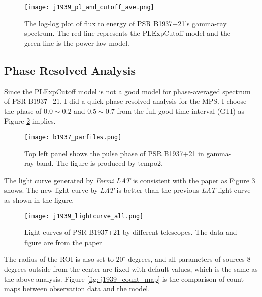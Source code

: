 \documentclass[12pt]{report}
\begin{document}
        \begin{figure}[!htp]
          \centering
          \texttt{[image: j1939\_pl\_and\_cutoff\_ave.png]}
          \caption{The log-log plot of flux to energy of PSR B1937+21’s gamma-ray spectrum.
            The red line represents the PLExpCutoff model and the green line is the power-law
            model. }
          \label{fig: j1939_pl_and_cutoff_ave}
        \end{figure}


    \subsection{Phase Resolved Analysis}
      Since the PLExpCutoff model is not a good model for phase-averaged spectrum of 
      PSR B1937+21, I did a quick phase-resolved analysis for the MPS. I choose the 
      phase of $0.0 \sim 0.2$ and $0.5 \sim 0.7$ from the full good time interval (GTI) as 
      Figure \ref{fig: j1939_phase} implies. 
      \begin{figure}[!htp]
        \centering 
        \texttt{[image: b1937\_parfiles.png]}
        \caption{Top left panel shows the pulse phase of PSR B1937+21 in gamma-ray band. 
          The figure is produced by tempo2.}
        \label{fig: j1939_phase}
      \end{figure}

      The light curve generated by \textit{Fermi LAT} is consistent with the paper 
      \citep{J1939_old} as Figure \ref{fig: j1939_light_curve_compare} shows. 
      The new light curve by \textit{LAT} is better than the previous \textit{LAT} light curve
      as shown in the figure. 

      \begin{figure}
        \centering 
        \texttt{[image: j1939\_lightcurve\_all.png]}
        \caption{Light curves of PSR B1937+21 by different telescopes. The data and figure
          are from the paper \citep{J1939_old}}
        \label{fig: j1939_light_curve_compare}
      \end{figure}


      The radius of the ROI is also set to $20^{\circ}$ degrees, and all parameters of 
      sources $8^{\circ}$ degrees outside from the center are fixed with default values, 
      which is the same as the above analysis. 
      Figure \ref{fig: j1939_count_map} is the comparison of count maps between 
      observation data and the model.
\end{document}
